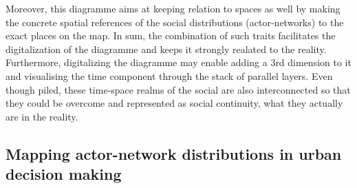 \documentclass[11pt]{report}
\begin{document}
Moreover, this diagramme aims at keeping relation to spaces as well by making the concrete spatial references of the social distributions (actor-networks) to the exact places on the map.
In sum, the combination of such traits facilitates the digitalization of the diagramme and keeps it strongly realated to the reality.
Furthermore, digitalizing the diagramme  may enable adding a 3rd dimension to it and visualising the time component through the stack of parallel layers. Even though piled, these time-space realms of the social are also interconnected so that they could be overcome and represented as social continuity, what they actually are in the reality. 
  
\subsection{Mapping actor-network distributions in urban decision making}
\end{document}

